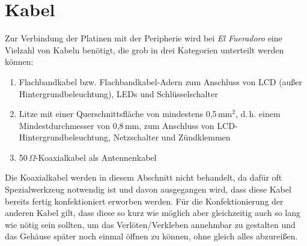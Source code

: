 \documentclass[paper=a4, parskip, numbers=noenddot, toc=listof, headsepline]{scrbook}
\newcommand{\anlage}{\emph{El Fueradoro}}
\begin{document}
		\section{Kabel}

			Zur Verbindung der Platinen mit der Peripherie wird bei {\anlage} eine Vielzahl von Kabeln benötigt, die grob in drei Kategorien unterteilt werden können:
			\begin{enumerate}
				\item  Flachbandkabel bzw. Flachbandkabel-Adern zum Anschluss von LCD (außer Hintergrundbeleuchtung), LEDs und Schlüsselschalter
				\item Litze mit einer Querschnittsfläche von mindestens 0,5\,mm$^2$, d.\,h. einem Mindestdurchmesser von 0,8\,mm, zum Anschluss von LCD-Hintergrundbeleuchtung, Netzschalter und
				      Zündklemmen
				\item 50\,$\Omega$-Koaxialkabel als Antennenkabel
			\end{enumerate}

			Die Koaxialkabel werden in diesem Abschnitt nicht behandelt, da dafür oft Spezialwerkzeug notwendig ist und davon ausgegangen wird, dass diese Kabel bereits fertig konfektioniert erworben werden. Für die Konfektionierung der anderen Kabel gilt, dass diese so kurz wie möglich aber gleichzeitig auch so lang wie nötig sein sollten, um das Verlöten/Verkleben annehmbar zu gestalten und das Gehäuse später noch einmal öffnen zu können, ohne gleich alles abzureißen.
\end{document}
